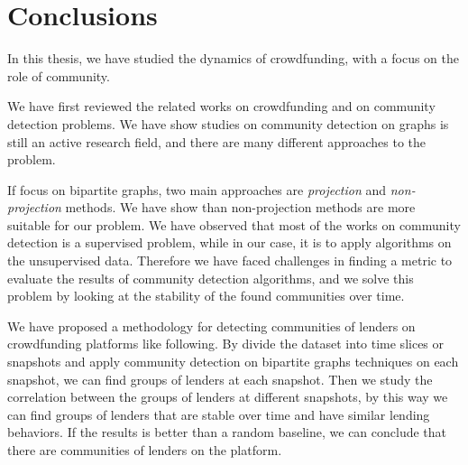 \section{Conclusions}
\begin{comment}

This community finding is a unsupervised problem.
Hence, there are different methodology for answer the question


SOmething to try

- \lstinline|adjusted_rand_score|

\section{Future works}

\begin{itemize}
	\item Extend to other platforms
	\item Transform the problem into a classical clustering problem where cluster is a Tag/Sector
	      and apply classical dynamic clustering tools.
	      Note that this part is currently in trying phase.
	      If we have time to make it now, we could move it to the section 4.
\end{itemize}
\end{comment}

In this thesis, we have studied the dynamics of crowdfunding, with a focus on the role of community.

We have first reviewed the related works on crowdfunding and on community detection problems.
We have show studies on community detection on graphs is still an active research field,
and there are many different approaches to the problem.

If focus on bipartite graphs, two main approaches are \textit{projection} and \textit{non-projection} methods.
We have show than non-projection methods are more suitable for our problem.
We have observed that most of the works on community detection is a supervised problem,
while in our case, it is to apply algorithms on the unsupervised data.
Therefore we have faced challenges in finding a metric to evaluate the results of community detection algorithms,
and we solve this problem by looking at the stability of the found communities over time.

We have proposed a methodology for detecting communities of lenders on crowdfunding platforms like following.
By divide the dataset into time slices or snapshots
and apply community detection on bipartite graphs techniques on each snapshot,
we can find groups of lenders at each snapshot.
Then we study the correlation between the groups of lenders at different snapshots,
by this way we can find groups of lenders that are stable over time and have similar lending behaviors.
If the results is better than a random baseline, we can conclude that there are communities of lenders on the platform.

